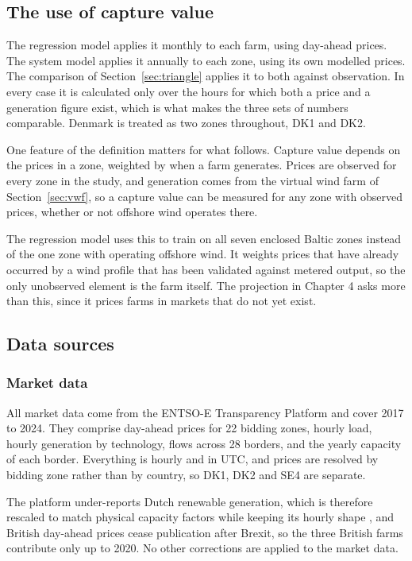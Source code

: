\subsection{The use of capture value}
\label{sec:currency}

The regression
model applies it monthly to each farm, using day-ahead prices. The system model
applies it annually to each zone, using its own modelled prices. The comparison
of Section~\ref{sec:triangle} applies it to both against observation. In every
case it is calculated only over the hours for which both a price and a
generation figure exist, which is what makes the three sets of numbers
comparable. Denmark is treated as two zones throughout, DK1 and DK2.

One feature of the definition matters for what follows. Capture value depends on
the prices in a zone, weighted by when a farm generates. Prices are observed for
every zone in the study, and generation comes from the virtual wind farm of
Section~\ref{sec:vwf}, so a capture value can be measured for any zone with
observed prices, whether or not offshore wind operates there.

The regression model uses this to train on all seven enclosed Baltic zones
instead of the one zone with operating offshore wind. It weights prices that
have already occurred by a wind profile that has been validated against metered
output, so the only unobserved element is the farm itself. The projection in
Chapter 4 asks more than this, since it prices farms in markets that do not yet
exist.

\subsection{Data sources}\label{sec:data}

\subsubsection{Market data}\label{sec:market_data}

All market data come from the ENTSO-E Transparency Platform and cover 2017 to
2024. They comprise day-ahead prices for 22 bidding zones, hourly load, hourly
generation by technology, flows across 28 borders, and the yearly capacity of
each border. Everything is hourly and in UTC, and prices are resolved by bidding
zone rather than by country, so DK1, DK2 and SE4 are separate.

The platform under-reports Dutch renewable generation, which is therefore
rescaled to match physical capacity factors while keeping its hourly shape
\cite{Jacquet2024}, and British day-ahead prices cease publication after
Brexit, so the three British farms contribute only up to 2020. No other
corrections are applied to the market data.

